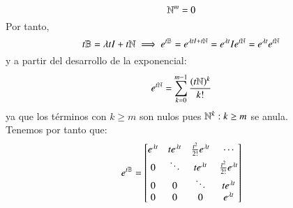 \begin{enumerate}
    $$
        \mathbb{N}^m = 0
    $$
    Por tanto, $$t\mathbb{B} = \lambda t I + t\mathbb{N} \implies e^{t\mathbb{B}} = e^{\lambda t I + t \mathbb{N}} = e^{\lambda t} I e^{t \mathbb{N}} =  e^{\lambda t} e^{t \mathbb{N}}$$
    y a partir del desarrollo de la exponencial:
    $$
        e^{t\mathbb{N}} = \sum_{k=0}^{m-1} \frac{(t\mathbb{N})^k}{k!}
    $$
    ya que los términos con $k \geq m$ son nulos pues $\mathbb{N}^k : k\geq m$ se anula.\\
    Tenemos por tanto que:
    $$
        e^{t\B} = \mx{
                        e^{\lambda t} & t e^{\lambda t} & \frac{t^2}{2!}e^{\lambda t} & \cdots\\
                        0 & \ddots & t e^{\lambda t} & \frac{t^2}{2!}e^{\lambda t}\\
                        0  & 0 & \ddots  & t e^{\lambda t}\\
                        0 & 0 & 0 & e^{\lambda t}
                    }
    $$
\end{enumerate}

